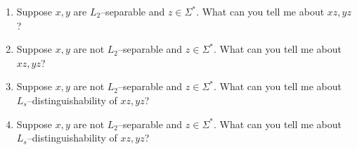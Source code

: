\begin{ex}
  \mbox{}
  \begin{enumerate}[label=\textnormal{(\alph*)},itemsep=0pt,nosep,noitemsep,partopsep=0pt,topsep=0pt,parsep=0pt]
  \item
    Suppose $x,y$ are $L_2$--separable and $z \in \Sigma^*$.
    What can you tell me about $xz,yz$?
  \item
    Suppose $x,y$ are not $L_2$--separable and $z \in \Sigma^*$.
    What can you tell me about $xz,yz$?
  \item
    Suppose $x,y$ are not $L_2$--separable and $z \in \Sigma^*$.
    What can you tell me about $L_s$--distinguishability of $xz,yz$?
  \item
    Suppose $x,y$ are not $L_2$--separable and $z \in \Sigma^*$.
    What can you tell me about $L_s$--distinguishability of $xz,yz$?
  \end{enumerate}
\end{ex}
  
